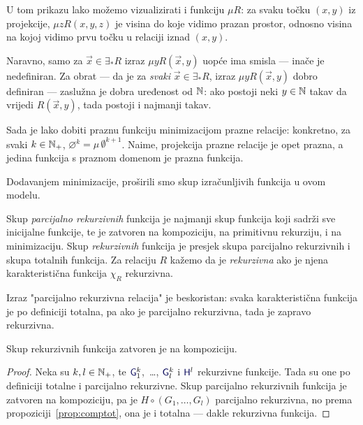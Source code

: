 U tom prikazu lako možemo vizualizirati i funkciju $\mu R$: za svaku točku $(x,y)$ iz projekcije, $\mu zR(x,y,z)$ je visina do koje vidimo prazan prostor, odnosno visina na kojoj vidimo prvu točku u relaciji iznad $(x,y)$. 

Naravno, samo za $\vec x\in\exists_*R$ izraz $\mu yR(\vec x,y)$ uopće ima smisla --- inače je nedefiniran. Za obrat --- da je za \emph{svaki} $\vec x\in\exists_*R$, izraz $\mu yR(\vec x,y)$ dobro definiran --- zaslužna je dobra uređenost od ${\mathbb N}$: ako postoji neki $y\in{\mathbb N}$ takav da vrijedi $R(\vec x,y)$, tada postoji i najmanji takav.

\begin{primjer}\label{pr:varnothingprek}
Sada je lako dobiti praznu funkciju minimizacijom prazne relacije: konkretno, za svaki $k\in{\mathbb N}_+$, $\varnothing^k=\mu\,\emptyset^{k+1}$. Naime, projekcija prazne relacije je opet prazna, a jedina funkcija s praznom domenom je prazna funkcija.
\end{primjer}

Dodavanjem minimizacije, proširili smo skup izračunljivih funkcija u ovom modelu.

\begin{definicija}\label{def:parcrek}
Skup \emph{parcijalno rekurzivnih} funkcija je najmanji skup funkcija koji sadrži sve inicijalne funkcije, te je zatvoren na kompoziciju, na primitivnu rekurziju, i na minimizaciju. Skup \emph{rekurzivnih} funkcija je presjek skupa parcijalno rekurzivnih i skupa totalnih funkcija. Za relaciju $R$ kažemo da je \emph{rekurzivna} ako je njena karakteristična funkcija $\chi_R$ rekurzivna.
\end{definicija}

Izraz "parcijalno rekurzivna relacija" je beskoristan: svaka karakteristična funkcija je po definiciji totalna, pa ako je parcijalno rekurzivna, tada je zapravo rekurzivna.

\begin{lema}\label{lm:comprek}
Skup rekurzivnih funkcija zatvoren je na kompoziciju.
\end{lema}
\begin{proof}
Neka su $k,l\in{\mathbb N}_+$, te $\f G_1^k$,~\ldots, $\f G_l^k$ i $\f H^l$ rekurzivne funkcije. Tada su one po definiciji totalne i parcijalno rekurzivne. Skup parcijalno rekurzivnih funkcija je zatvoren na kompoziciju, pa je $H\circ(G_1,\dotsc,G_l)$ parcijalno rekurzivna, no prema propoziciji~\ref{prop:comptot}, ona je i totalna --- dakle rekurzivna funkcija.
\end{proof}


